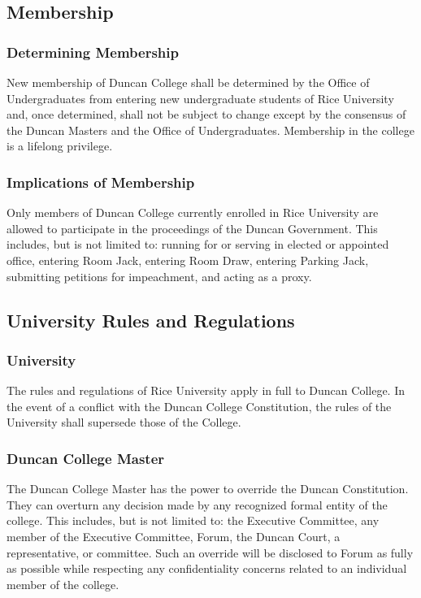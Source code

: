 \documentclass[USletter,12pt]{article}
\begin{document}
\subsection{Membership}


\subsubsection{Determining Membership}

New membership of Duncan College shall be determined by the Office of Undergraduates from entering new undergraduate students of Rice University and, once determined, shall not be subject to change except by the consensus of the Duncan Masters and the Office of Undergraduates.  Membership in the college is a lifelong privilege.


\subsubsection{Implications of Membership}

Only members of Duncan College currently enrolled in Rice University are allowed to participate in the proceedings of the Duncan Government.  This includes, but is not limited to: running for or serving in elected or appointed office, entering Room Jack, entering Room Draw, entering Parking Jack, submitting petitions for impeachment, and acting as a proxy.

\subsection{University Rules and Regulations}

\subsubsection{University}
The rules and regulations of Rice University apply in full to Duncan College.  In the event of a conflict with the Duncan College Constitution, the rules of the University shall supersede those of the College.

\subsubsection{Duncan College Master}
The Duncan College Master has the power to override the Duncan Constitution.  They can overturn any decision made by any recognized formal entity of the college. This includes, but is not limited to: the Executive Committee, any member of the Executive Committee, Forum, the Duncan Court, a representative, or committee.  Such an override will be disclosed to Forum as fully as possible while respecting any confidentiality concerns related to an individual member of the college.
\end{document}
